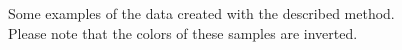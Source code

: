 \begin{figure}
\begin{subfigure}[b]{0.19\textwidth}
    \end{subfigure}
    \begin{subfigure}[b]{0.19\textwidth}
    \end{subfigure}
    \begin{subfigure}[b]{0.19\textwidth}
    \end{subfigure}
    \caption{Some examples of the data created with the described method. Please note that the colors of these samples are inverted. }
\end{figure}

